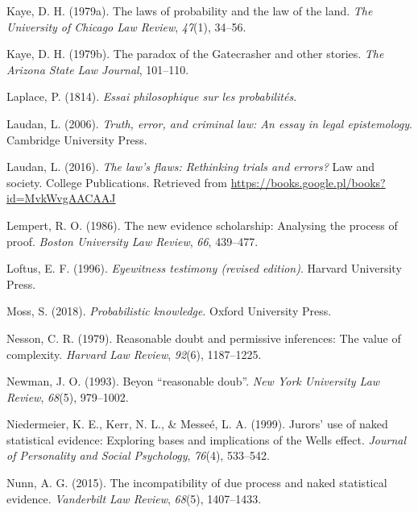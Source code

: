 \documentclass[10pt,dvipsnames,enabledeprecatedfontcommands]{scrartcl}
\begin{document}
\leavevmode\hypertarget{ref-kaye79}{}%
Kaye, D. H. (1979a). The laws of probability and the law of the land.
\emph{The University of Chicago Law Review}, \emph{47}(1), 34--56.

\leavevmode\hypertarget{ref-Kaye79gate}{}%
Kaye, D. H. (1979b). The paradox of the Gatecrasher and other stories.
\emph{The Arizona State Law Journal}, 101--110.

\leavevmode\hypertarget{ref-Laplace1814}{}%
Laplace, P. (1814). \emph{Essai philosophique sur les probabilités}.

\leavevmode\hypertarget{ref-laudan2006truth}{}%
Laudan, L. (2006). \emph{Truth, error, and criminal law: An essay in
legal epistemology}. Cambridge University Press.

\leavevmode\hypertarget{ref-laudan2016law}{}%
Laudan, L. (2016). \emph{The law's flaws: Rethinking trials and errors?}
Law and society. College Publications. Retrieved from
\url{https://books.google.pl/books?id=MvkWvgAACAAJ}

\leavevmode\hypertarget{ref-Lempert1986}{}%
Lempert, R. O. (1986). The new evidence scholarship: Analysing the
process of proof. \emph{Boston University Law Review}, \emph{66},
439--477.

\leavevmode\hypertarget{ref-Loftus1996}{}%
Loftus, E. F. (1996). \emph{Eyewitness testimony (revised edition)}.
Harvard University Press.

\leavevmode\hypertarget{ref-moss2018}{}%
Moss, S. (2018). \emph{Probabilistic knowledge}. Oxford University
Press.

\leavevmode\hypertarget{ref-Nesson1979Reasonable-doub}{}%
Nesson, C. R. (1979). Reasonable doubt and permissive inferences: The
value of complexity. \emph{Harvard Law Review}, \emph{92}(6),
1187--1225.

\leavevmode\hypertarget{ref-newman1993}{}%
Newman, J. O. (1993). Beyon ``reasonable doub''. \emph{New York
University Law Review}, \emph{68}(5), 979--1002.

\leavevmode\hypertarget{ref-niedermeierEtAl1999}{}%
Niedermeier, K. E., Kerr, N. L., \& Messeé, L. A. (1999). Jurors' use of
naked statistical evidence: Exploring bases and implications of the
Wells effect. \emph{Journal of Personality and Social Psychology},
\emph{76}(4), 533--542.

\leavevmode\hypertarget{ref-nunn2015}{}%
Nunn, A. G. (2015). The incompatibility of due process and naked
statistical evidence. \emph{Vanderbilt Law Review}, \emph{68}(5),
1407--1433.
\end{document}

